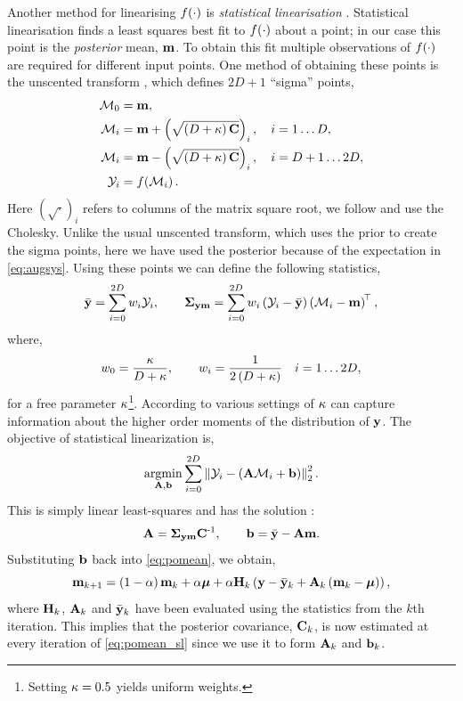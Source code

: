 \documentclass{article} %
\begin{document}
Another method for linearising $\nonlin{\cdot}$ is \emph{statistical
    linearisation} \cite{Geist2010}. Statistical linearisation finds a least
squares best fit to $\nonlin{\cdot}$ about a point; in our case
this point is the \emph{posterior} mean, $\pomean$. To obtain this fit multiple
observations of $\nonlin{\cdot}$ are required for different input points. One
method of obtaining these points is the unscented transform \cite{Julier2004},
which defines $2D+1$ ``sigma'' points,
\begin{align}
    \Sfunc_0 &= \pomean, \\
    \Sfunc_i &= \pomean + \brac{\sqrt{\brac{D + \scoef} \pocov}}_i,
        \quad i = 1 \ldots D, \\
    \Sfunc_i &= \pomean - \brac{\sqrt{\brac{D + \scoef} \pocov}}_i,
        \quad i = D+1 \ldots 2D, \\
    \Sobs_i &= \nonlin{\Sfunc_i}.
\end{align}
Here $(\sqrt{\cdot})_i$ refers to columns of the matrix square root, we follow
\cite{Julier2004} and use the Cholesky. Unlike the usual unscented transform,
which uses the prior to create the sigma points, here we have used the
posterior because of the expectation in \eqref{eq:augsys}. Using these points
we can define the following statistics,
\begin{equation}
    \bar\obs = \sum^{2D}_{i=0} \Sw_i \Sobs_i,
    \qquad
    \xcov = \sum^{2D}_{i=0} \Sw_i \brac{\Sobs_i - \bar\obs}
        \brac{\Sfunc_i - \pomean}\transpose,
\end{equation}
where,
\begin{equation}
    \Sw_0 = \frac{\scoef}{D + \scoef},
        \qquad \Sw_i = \frac{1}{2\brac{D + \scoef}}
        \quad i = 1 \ldots 2D,
\end{equation}
for a free parameter $\scoef$\footnote{Setting $\scoef = 0.5$ yields
    uniform weights.}. According to \cite{Julier2004} various settings of
$\scoef$ can capture information about the higher order moments of the
distribution of $\obs$. The objective of statistical linearization is,
\begin{equation}
    \argmin_{\Linmat, \intcpt} \sum^{2D}_{i=0} 
        \lnorm{2}{\Sobs_i - \brac{\Linmat\Sfunc_i + \intcpt}}^2.
\end{equation}
This is simply linear least-squares and has the solution \cite{Geist2010}:
\begin{equation}
    \Linmat = \xcov \pocov\inv, \qquad
    \intcpt = \bar\obs - \Linmat\pomean.
\end{equation}
Substituting $\intcpt$ back into \eqref{eq:pomean}, we obtain, 
\begin{equation}
    \pomean_{k+1} = \brac{1-\step}\pomean_k + \step\prmean 
        + \step\Kgain_k\brac{\obs - \bar\obs_k 
        + \Linmat_k\brac{\pomean_k - \prmean}},
    \label{eq:pomean_sl}
\end{equation}
where $\Kgain_k$, $\Linmat_k$ and $\bar\obs_k$ have been evaluated using the
statistics from the $k$th iteration. This implies that the posterior
covariance, $\pocov_k$, is now estimated at every iteration of
\eqref{eq:pomean_sl} since we use it to form $\Linmat_k$ and $\intcpt_k$.
\end{document}
